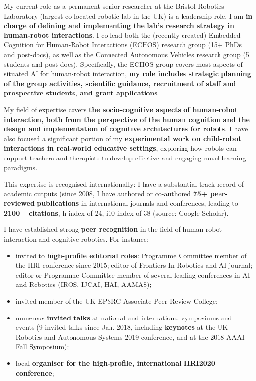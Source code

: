 \documentclass[11pt,a4paper]{report}
\begin{document}
My current role as a permanent senior researcher at the Bristol Robotics
Laboratory (largest co-located robotic lab in the UK) is a leadership role. I am
\textbf{in charge of defining and implementing the lab's research strategy in
human-robot interactions}. I co-lead both the (recently created) Embedded
Cognition for Human-Robot Interactions (ECHOS) research group (15+ PhDs and
post-docs), as well as the Connected Autonomous Vehicles research group (5
students and post-docs). Specifically, the ECHOS group covers most aspects of
situated AI for human-robot interaction, \textbf{my role includes strategic
planning of the group activities, scientific guidance, recruitment of staff and
prospective students, and grant applications}.

My field of expertise covers \textbf{the socio-cognitive aspects of
human-robot interaction, both from the perspective of the human cognition and
the design and implementation of cognitive architectures for robots}. I have
also focused a significant portion of my \textbf{experimental work on
child-robot interactions in real-world educative settings}, exploring how robots
can support teachers and therapists to develop effective and engaging novel
learning paradigms.

This expertise is recognised internationally: I have a substantial track record
of academic outputs (since 2008, I have authored or co-authored \textbf{75+ peer-reviewed
publications} in international journals and conferences, leading to \textbf{2100+
citations}, h-index of 24, i10-index of 38 (source: Google Scholar).

I have established strong \textbf{peer recognition} in the field of human-robot interaction
and cognitive robotics. For instance:

\begin{itemize}[noitemsep,topsep=0pt,parsep=0pt,partopsep=0pt]
    \item invited to \textbf{high-profile editorial roles}: Programme Committee member of the HRI
conference since 2015; editor of Frontiers In Robotics and AI journal; editor or
Programme Committee member of several leading conferences in AI and Robotics (IROS, IJCAI, HAI, AAMAS);
    \item invited member of the UK EPSRC Associate Peer Review College;
    \item numerous \textbf{invited talks} at national and international symposiums and
        events (9 invited talks since Jan. 2018, including \textbf{keynotes} at the UK Robotics
and Autonomous Systems 2019 conference, and at the 2018 AAAI Fall Symposium);
    \item local \textbf{organiser for the high-profile, international HRI2020
        conference};
\end{itemize}
\end{document}
